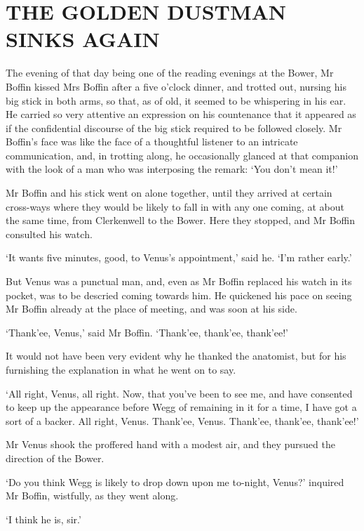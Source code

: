 
\chapter{THE GOLDEN DUSTMAN SINKS AGAIN}

The evening of that day being one of the reading evenings at the Bower,
Mr Boffin kissed Mrs Boffin after a five o’clock dinner, and trotted
out, nursing his big stick in both arms, so that, as of old, it seemed
to be whispering in his ear. He carried so very attentive an expression
on his countenance that it appeared as if the confidential discourse of
the big stick required to be followed closely. Mr Boffin’s face was like
the face of a thoughtful listener to an intricate communication, and, in
trotting along, he occasionally glanced at that companion with the look
of a man who was interposing the remark: ‘You don’t mean it!’

Mr Boffin and his stick went on alone together, until they arrived at
certain cross-ways where they would be likely to fall in with any one
coming, at about the same time, from Clerkenwell to the Bower. Here they
stopped, and Mr Boffin consulted his watch.

‘It wants five minutes, good, to Venus’s appointment,’ said he. ‘I’m
rather early.’

But Venus was a punctual man, and, even as Mr Boffin replaced his watch
in its pocket, was to be descried coming towards him. He quickened his
pace on seeing Mr Boffin already at the place of meeting, and was soon
at his side.

‘Thank’ee, Venus,’ said Mr Boffin. ‘Thank’ee, thank’ee, thank’ee!’

It would not have been very evident why he thanked the anatomist, but
for his furnishing the explanation in what he went on to say.

‘All right, Venus, all right. Now, that you’ve been to see me, and have
consented to keep up the appearance before Wegg of remaining in it for a
time, I have got a sort of a backer. All right, Venus. Thank’ee, Venus.
Thank’ee, thank’ee, thank’ee!’

Mr Venus shook the proffered hand with a modest air, and they pursued
the direction of the Bower.

‘Do you think Wegg is likely to drop down upon me to-night, Venus?’
inquired Mr Boffin, wistfully, as they went along.

‘I think he is, sir.’


